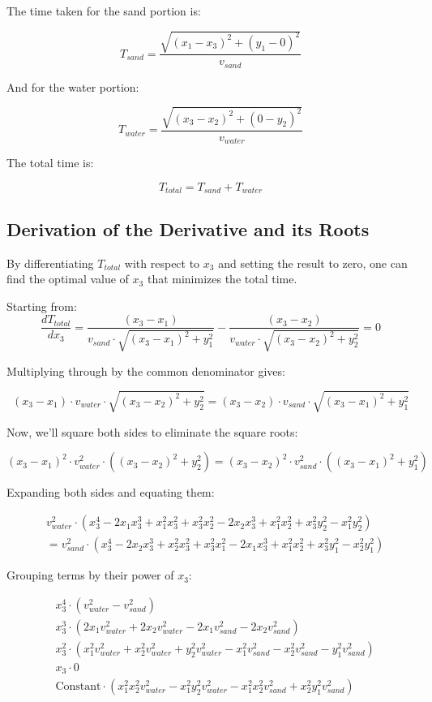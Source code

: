 \documentclass[11pt, a4paper]{article}
\begin{document}
The time taken for the sand portion is:

\[ T_{sand} = \frac{\sqrt{(x_1 - x_3)^2 + (y_1 - 0)^2}}{v_{sand}} \]

And for the water portion:

\[ T_{water} = \frac{\sqrt{(x_3 - x_2)^2 + (0 - y_2)^2}}{v_{water}} \]

The total time is:

\[ T_{total} = T_{sand} + T_{water} \]


\subsection{Derivation of the Derivative and its Roots}

By differentiating \( T_{total} \) with respect to \( x_3 \) and setting the result to zero,
one can find the optimal value of \( x_3 \) that minimizes the total time.

Starting from:
\[ \frac{d T_{total}}{d x_3} = \frac{(x_3 - x_1)}{v_{sand} \cdot \sqrt{(x_3 - x_1)^2 + y_1^2}} - \frac{(x_3 - x_2)}{v_{water} \cdot \sqrt{(x_3 - x_2)^2 + y_2^2}} = 0 \]

Multiplying through by the common denominator gives:

\[ (x_3 - x_1) \cdot v_{water} \cdot \sqrt{(x_3 - x_2)^2 + y_2^2} = (x_3 - x_2) \cdot v_{sand} \cdot \sqrt{(x_3 - x_1)^2 + y_1^2} \]

Now, we'll square both sides to eliminate the square roots:

\[ (x_3 - x_1)^2 \cdot v_{water}^2 \cdot ((x_3 - x_2)^2 + y_2^2) = (x_3 - x_2)^2 \cdot v_{sand}^2 \cdot ((x_3 - x_1)^2 + y_1^2) \]



Expanding both sides and equating them:

\begin{align*}
& v_{water}^2 \cdot (x_3^4 - 2x_1x_3^3 + x_1^2x_3^2 + x_3^2x_2^2 - 2x_2x_3^3 + x_1^2x_2^2 + x_3^2y_2^2 - x_1^2y_2^2) \\
& = v_{sand}^2 \cdot (x_3^4 - 2x_2x_3^3 + x_2^2x_3^2 + x_3^2x_1^2 - 2x_1x_3^3 + x_1^2x_2^2 + x_3^2y_1^2 - x_2^2y_1^2)
\end{align*}

Grouping terms by their power of \(x_3\):

\begin{align*}
& x_3^4 \cdot (v_{water}^2 - v_{sand}^2) \\
& x_3^3 \cdot (2x_1v_{water}^2 + 2x_2v_{water}^2 - 2x_1v_{sand}^2 - 2x_2v_{sand}^2) \\
& x_3^2 \cdot (x_1^2v_{water}^2 + x_2^2v_{water}^2 + y_2^2v_{water}^2 - x_1^2v_{sand}^2 - x_2^2v_{sand}^2 - y_1^2v_{sand}^2) \\
& x_3 \cdot 0 \\
& \text{Constant} \cdot (x_1^2x_2^2v_{water}^2 - x_1^2y_2^2v_{water}^2 - x_1^2x_2^2v_{sand}^2 + x_2^2y_1^2v_{sand}^2)
\end{align*}
\end{document}
